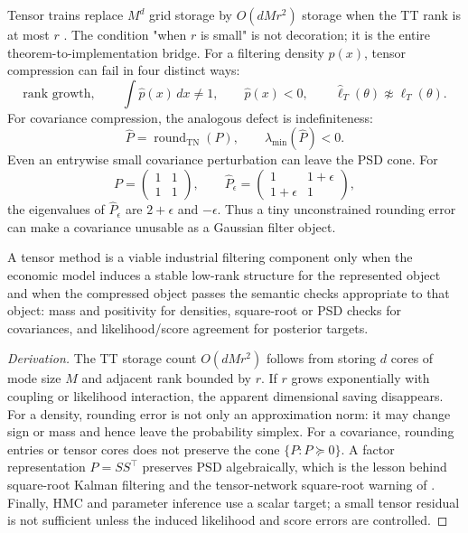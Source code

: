 Tensor trains replace \(M^d\) grid storage by \(O(dMr^2)\) storage when the
TT rank is at most \(r\) \citep{oseledets2011tt}.  The condition "when \(r\)
is small" is not decoration; it is the entire theorem-to-implementation bridge.
For a filtering density \(p(x)\), tensor compression can fail in four distinct
ways:
\begin{equation}
  \text{rank growth},\qquad
  \int \widehat p(x)\,dx \ne 1,\qquad
  \widehat p(x)<0,\qquad
  \widehat\ell_T(\theta)\not\approx \ell_T(\theta).
  \label{eq:bf-hd-synth-tt-defects}
\end{equation}
For covariance compression, the analogous defect is indefiniteness:
\begin{equation}
  \widehat P=\operatorname{round}_{\mathrm{TN}}(P),\qquad
  \lambda_{\min}(\widehat P)<0.
  \label{eq:bf-hd-synth-tn-indefinite}
\end{equation}
Even an entrywise small covariance perturbation can leave the PSD cone.  For
\[
  P=\begin{pmatrix}1&1\\1&1\end{pmatrix},\qquad
  \widehat P_\epsilon=\begin{pmatrix}1&1+\epsilon\\1+\epsilon&1\end{pmatrix},
\]
the eigenvalues of \(\widehat P_\epsilon\) are \(2+\epsilon\) and
\(-\epsilon\).  Thus a tiny unconstrained rounding error can make a covariance
unusable as a Gaussian filter object.

\begin{proposition}
\label{prop:bf-hd-tensor-viability}
A tensor method is a viable industrial filtering component only when the
economic model induces a stable low-rank structure for the represented object
and when the compressed object passes the semantic checks appropriate to that
object: mass and positivity for densities, square-root or PSD checks for
covariances, and likelihood/score agreement for posterior targets.
\end{proposition}

\begin{proof}[Derivation]
The TT storage count \(O(dMr^2)\) follows from storing \(d\) cores of mode size
\(M\) and adjacent rank bounded by \(r\).  If \(r\) grows exponentially with
coupling or likelihood interaction, the apparent dimensional saving disappears.
For a density, rounding error is not only an approximation norm: it may change
sign or mass and hence leave the probability simplex.  For a covariance,
rounding entries or tensor cores does not preserve the cone
\(\{P:P\succeq0\}\).  A factor representation \(P=SS^\top\) preserves PSD
algebraically, which is the lesson behind square-root Kalman filtering and the
tensor-network square-root warning of \citet{menzen2024tnsrkf}.  Finally, HMC
and parameter inference use a scalar target; a small tensor residual is not
sufficient unless the induced likelihood and score errors are controlled.
\end{proof}

